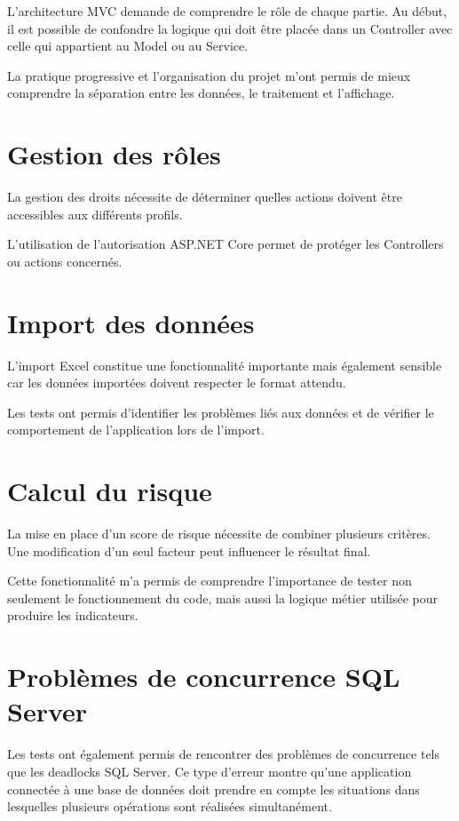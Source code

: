 \documentclass[12pt,a4paper,oneside]{report}
\begin{document}
L'architecture MVC demande de comprendre le rôle de chaque partie. Au début, il est possible de confondre la logique qui doit être placée dans un Controller avec celle qui appartient au Model ou au Service.

La pratique progressive et l'organisation du projet m'ont permis de mieux comprendre la séparation entre les données, le traitement et l'affichage.

\section{Gestion des rôles}

La gestion des droits nécessite de déterminer quelles actions doivent être accessibles aux différents profils.

L'utilisation de l'autorisation ASP.NET Core permet de protéger les Controllers ou actions concernés.

\section{Import des données}

L'import Excel constitue une fonctionnalité importante mais également sensible car les données importées doivent respecter le format attendu.

Les tests ont permis d'identifier les problèmes liés aux données et de vérifier le comportement de l'application lors de l'import.

\section{Calcul du risque}

La mise en place d'un score de risque nécessite de combiner plusieurs critères. Une modification d'un seul facteur peut influencer le résultat final.

Cette fonctionnalité m'a permis de comprendre l'importance de tester non seulement le fonctionnement du code, mais aussi la logique métier utilisée pour produire les indicateurs.

\section{Problèmes de concurrence SQL Server}

Les tests ont également permis de rencontrer des problèmes de concurrence tels que les deadlocks SQL Server. Ce type d'erreur montre qu'une application connectée à une base de données doit prendre en compte les situations dans lesquelles plusieurs opérations sont réalisées simultanément.
\end{document}
